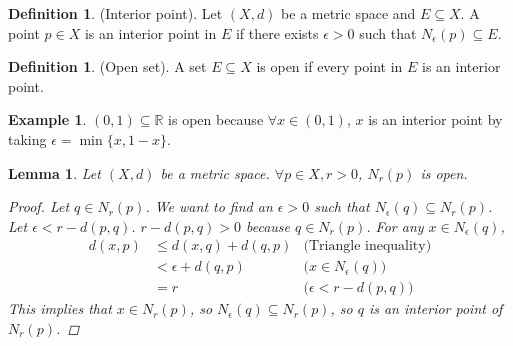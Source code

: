 \documentclass[10pt]{article}
\newcommand{\R}{\mathbb{R}}
\newtheorem{lemma}[theorem]{Lemma}
\theoremstyle{definition}
\newtheorem{definition}[theorem]{Definition}
\newtheorem{example}[theorem]{Example}
\theoremstyle{remark}
\begin{document}
\begin{definition}
    (Interior point).
    Let $(X, d)$ be a metric space and $E \subseteq X$. A point $p \in X$ is an interior point in $E$ if there exists $\epsilon > 0$ such that $N_\epsilon(p) \subseteq E$.
\end{definition}

\begin{definition}
    (Open set).
    A set $E \subseteq X$ is open if every point in $E$ is an interior point.
\end{definition}

\begin{example}
    $(0, 1) \subseteq \R$ is open because $\forall x \in (0, 1)$, $x$ is an interior point by taking $\epsilon = \min\{x, 1 - x\}$.
\end{example}

\begin{lemma}
    Let $(X, d)$ be a metric space. $\forall p \in X, r > 0$, $N_r(p)$ is open.
    \begin{proof}
        Let $q \in N_r(p)$. We want to find an $\epsilon > 0$ such that $N_\epsilon(q) \subseteq N_r(p)$. Let $\epsilon < r - d(p, q)$. $r - d(p, q) > 0$ because $q \in N_r(p)$.
        For any $x \in N_\epsilon(q)$,
        \begin{align*}
            d(x, p) &\leq d(x, q) + d(q, p) & \text{(Triangle inequality)} \\
                    &< \epsilon + d(q, p) & \text{($x \in N_\epsilon(q)$)} \\
                    &= r & \text{($\epsilon < r - d(p, q)$)}
        \end{align*}
        This implies that $x \in N_r(p)$, so $N_\epsilon(q) \subseteq N_r(p)$, so $q$ is an interior point of $N_r(p)$.
    \end{proof}
\end{lemma}
\end{document}
